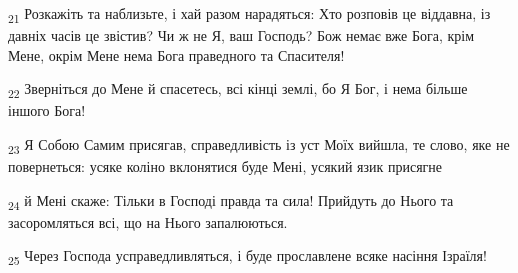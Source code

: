 \begin{tcolorbox}
\textsubscript{21} Розкажіть та наблизьте, і хай разом нарадяться: Хто розповів це віддавна, із давніх часів це звістив? Чи ж не Я, ваш Господь? Бож немає вже Бога, крім Мене, окрім Мене нема Бога праведного та Спасителя!
\end{tcolorbox}
\begin{tcolorbox}
\textsubscript{22} Зверніться до Мене й спасетесь, всі кінці землі, бо Я Бог, і нема більше іншого Бога!
\end{tcolorbox}
\begin{tcolorbox}
\textsubscript{23} Я Собою Самим присягав, справедливість із уст Моїх вийшла, те слово, яке не повернеться: усяке коліно вклонятися буде Мені, усякий язик присягне
\end{tcolorbox}
\begin{tcolorbox}
\textsubscript{24} й Мені скаже: Тільки в Господі правда та сила! Прийдуть до Нього та засоромляться всі, що на Нього запалюються.
\end{tcolorbox}
\begin{tcolorbox}
\textsubscript{25} Через Господа усправедливляться, і буде прославлене всяке насіння Ізраїля!
\end{tcolorbox}
